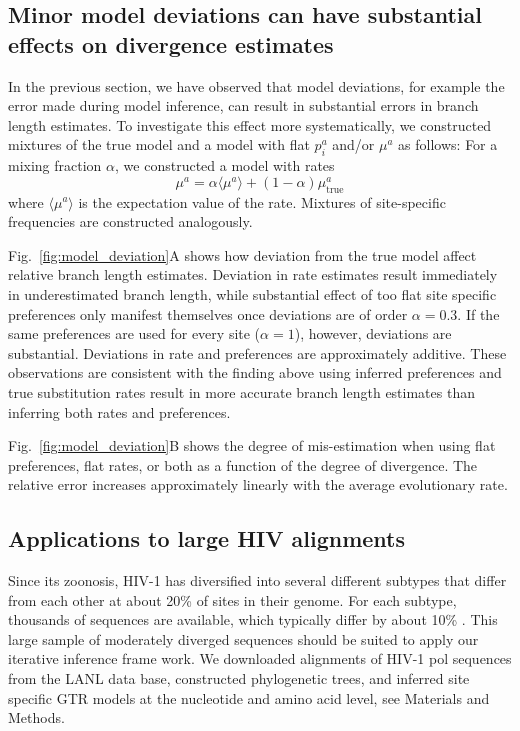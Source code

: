 \documentclass[aps,rmp,twocolumn]{revtex4}
\newcommand{\eqp}{p}
\begin{document}
\subsection*{Minor model deviations can have substantial effects on divergence estimates}
In the previous section, we have observed that model deviations, for example the error made during model inference, can result in substantial errors in branch length estimates.
To investigate this effect more systematically, we constructed mixtures of the true model and a model with flat $\eqp_i^a$ and/or $\mu^a$ as follows:
For a mixing fraction $\alpha$, we constructed a model with rates
\begin{equation}
\label{eq:mixture_model}
	\mu^a = \alpha \langle \mu^a\rangle + (1-\alpha) \mu^a_{\mathrm{true}}
\end{equation}
where $\langle \mu^a\rangle$ is the expectation value of the rate.
Mixtures of site-specific frequencies are constructed analogously.

Fig.~\ref{fig:model_deviation}A shows how deviation from the true model affect relative branch length estimates.
Deviation in rate estimates result immediately in underestimated branch length, while substantial effect of too flat site specific preferences only manifest themselves once deviations are of order $\alpha = 0.3$.
If the same preferences are used for every site ($\alpha=1$), however, deviations are substantial.
Deviations in rate and preferences are approximately additive.
These observations are consistent with the finding above using inferred preferences and true substitution rates result in more accurate branch length estimates than inferring both rates and preferences.

Fig.~\ref{fig:model_deviation}B shows the degree of mis-estimation when using flat preferences, flat rates, or both as a function of the degree of divergence.
The relative error increases approximately linearly with the average evolutionary rate.


\subsection*{Applications to large HIV alignments}
Since its zoonosis, HIV-1 has diversified into several different subtypes that differ from each other at about 20\% of sites in their genome.
For each subtype, thousands of sequences are available, which typically differ by about 10\% \citep{LANL}.
This large sample of moderately diverged sequences should be suited to apply our iterative inference frame work.
We downloaded alignments of HIV-1 pol sequences from the LANL data base, constructed phylogenetic trees, and inferred site specific GTR models at the nucleotide and amino acid level, see Materials and Methods.
\end{document}
